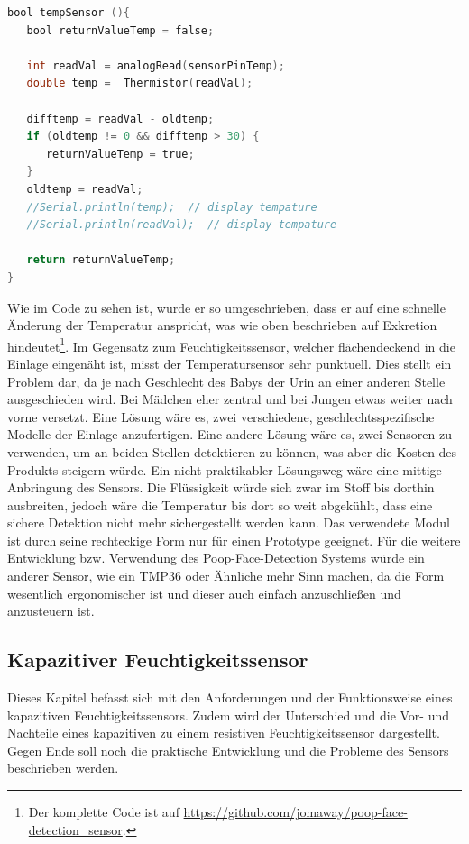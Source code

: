 \begin{lstlisting}[language=C, caption=Trigger für Exkretion durch
Temperaturvergleich.]
bool tempSensor (){
   bool returnValueTemp = false;
    
   int readVal = analogRead(sensorPinTemp);
   double temp =  Thermistor(readVal);
	
   difftemp = readVal - oldtemp;
   if (oldtemp != 0 && difftemp > 30) {
      returnValueTemp = true;
   }
   oldtemp = readVal;
   //Serial.println(temp);  // display tempature
   //Serial.println(readVal);  // display tempature
			  
   return returnValueTemp;
}
\end{lstlisting}

Wie im Code zu sehen ist, wurde er so umgeschrieben, dass er auf eine
schnelle Änderung der Temperatur anspricht, was wie oben beschrieben
auf Exkretion hindeutet\footnote{Der komplette Code ist auf
\url{https://github.com/jomaway/poop-face-detection_sensor}.}.
Im Gegensatz zum Feuchtigkeitssensor, welcher flächendeckend in die
Einlage eingenäht ist, misst der Temperatursensor sehr punktuell. Dies
stellt ein Problem dar, da je nach Geschlecht des Babys der Urin an
einer anderen Stelle ausgeschieden wird. Bei Mädchen eher zentral und
bei Jungen etwas weiter nach vorne versetzt. Eine Lösung wäre es, zwei
verschiedene, geschlechtsspezifische Modelle der Einlage anzufertigen.
Eine andere Lösung wäre es, zwei Sensoren zu verwenden, um an beiden
Stellen detektieren zu können, was aber die Kosten des Produkts
steigern würde. Ein nicht praktikabler Lösungsweg wäre eine mittige
Anbringung des Sensors. Die Flüssigkeit würde sich zwar im Stoff bis
dorthin ausbreiten, jedoch wäre die Temperatur bis dort so weit
abgekühlt, dass eine sichere Detektion nicht mehr sichergestellt
werden kann.
Das verwendete Modul ist durch seine rechteckige Form nur für einen
Prototype geeignet. Für die weitere Entwicklung bzw. Verwendung des
Poop-Face-Detection Systems würde ein anderer Sensor, wie ein TMP36
oder Ähnliche mehr Sinn machen, da die Form wesentlich ergonomischer
ist und dieser auch einfach anzuschließen und anzusteuern ist.

\subsection{Kapazitiver Feuchtigkeitssensor}
\label{sec:cap_sensor}

Dieses Kapitel befasst sich mit den Anforderungen und der Funktionsweise eines kapazitiven Feuchtigkeitssensors. Zudem wird der Unterschied und die Vor- und Nachteile eines kapazitiven zu einem resistiven Feuchtigkeitssensor dargestellt. Gegen Ende soll noch die praktische Entwicklung und die Probleme des Sensors beschrieben werden.


